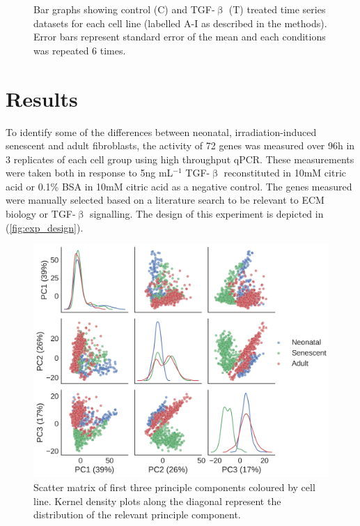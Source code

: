 \documentclass[alpha-refs]{wiley-article}
\newcommand{\tgf}{TGF-$\upbeta$}
\begin{document}
\begin{figure}[p]
\begin{minipage}{0.1\textwidth}
	\end{minipage}
	\caption{Bar graphs showing control (C) and \tgf{} (T) treated time series datasets for each cell line (labelled A-I as described in the methods). Error bars represent standard error of the mean and each conditions was repeated 6 times.}
	\label{fig:bar_graphs}
\end{figure}

\section{Results}
To identify some of the differences between neonatal, irradiation-induced senescent and adult fibroblasts, the activity of 72 genes was measured over 96h in 3 replicates of each cell group using high throughput qPCR. These measurements were taken both in response to 5ng mL$^{-1}$ \tgf{} reconstituted in 10mM citric acid or 0.1\% BSA in 10mM citric acid as a negative control. The genes measured were manually selected based on a literature search to be relevant to ECM biology or \tgf{} signalling. The design of this experiment is depicted in (\cref{fig:exp_design}).
%
\begin{figure}[t]
	\centering
	\includegraphics[width=\textwidth]{img/qc/cell_line}
	\caption{Scatter matrix of first three principle components coloured by cell line. Kernel density plots along the diagonal represent the distribution of the relevant principle component.}
	\label{fig:qc:cell_line}
\end{figure}
\end{document}
